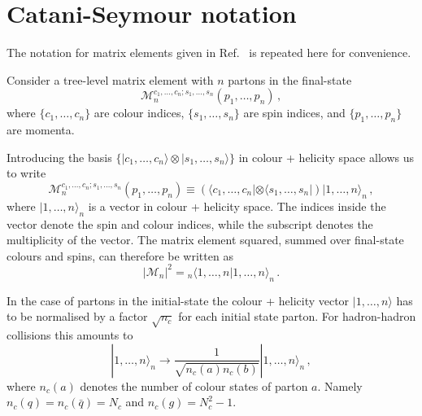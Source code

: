\documentclass[main.tex]{subfiles}
\begin{document}
\chapter{Catani-Seymour notation}
\label{appendix:catani_seymour}
    The notation for matrix elements given in Ref.~\cite{Catani:1996vz}
    is repeated here for convenience.

    Consider a tree-level matrix element with $n$ partons in
    the final-state
    \begin{equation}\label{eqn:CS_ME}
        \mathcal{M}^{c_{1},\ldots,c_{n};s_{1},\ldots,s_{n}}_{n}(p_{1},\ldots,p_{n}) \, ,
    \end{equation}
    where $\{c_{1},\ldots,c_{n}\}$ are colour indices,
    $\{s_{1},\ldots,s_{n}\}$ are spin indices,
    and $\{p_{1},\ldots,p_{n}\}$ are momenta.

    Introducing the basis $\{| c_{1},\ldots,c_{n} \rangle \otimes | s_{1},\ldots,s_{n} \rangle \}$
    in colour + helicity space allows us to write
    \begin{equation}\label{eqn:CS_hilbert}
        \mathcal{M}^{c_{1},\ldots,c_{n};s_{1},\ldots,s_{n}}_{n}(p_{1},\ldots,p_{n}) \equiv \left(\langle c_{1},\ldots,c_{n} | \otimes \langle s_{1},\ldots,s_{n} | \right) | 1, \ldots,n \rangle_{n} \, ,
    \end{equation}
    where $|1, \ldots, n \rangle_{n}$ is a vector in colour + helicity space.
    The indices inside the vector denote the spin and colour indices,
    while the subscript denotes the multiplicity of the vector.
    The matrix element squared, summed over final-state colours and spins,
    can therefore be written as
    \begin{equation}\label{eqn:CS_ME2}
        |\mathcal{M}_{n}|^{2} = {}_{n} \langle 1,\ldots,n|1,\ldots,n\rangle_{n} \, .
    \end{equation}

    In the case of partons in the initial-state the colour + helicity vector
    $|1, \ldots, n \rangle$ has to be normalised by a factor $\sqrt{n_{c}}$ for each
    initial state parton. For hadron-hadron collisions this amounts to
    \begin{equation}
        | 1, \ldots, n \rangle_{n} \rightarrow \dfrac{1}{\sqrt{n_{c}(a)n_{c}(b)}} | 1, \ldots, n \rangle_{n} \, ,
    \end{equation}
    where $n_{c}(a)$ denotes the number of colour states of parton $a$.
    Namely $n_{c}(q) = n_{c}(\bar{q}) = N_{c}$ and $n_{c}(g) = N_{c}^{2}-1$.
\end{document}

